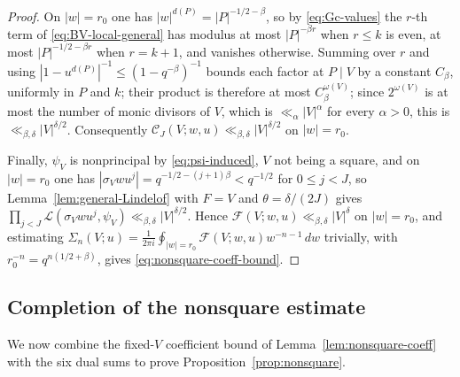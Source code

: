 \documentclass[a4paper,reqno]{amsart}
\numberwithin{equation}{section}
\theoremstyle{remark}
\theoremstyle{definition}
\begin{document}
\begin{proof}
On $|w|=r_0$ one has $|w|^{d(P)}=|P|^{-1/2-\beta}$, so by
\eqref{eq:Gc-values} the $r$-th term of \eqref{eq:BV-local-general} has
modulus at most $|P|^{-\beta r}$ when $r\le k$ is even, at most
$|P|^{-1/2-\beta r}$ when $r=k+1$, and vanishes otherwise. Summing over $r$
and using $|1-u^{d(P)}|^{-1}\le(1-q^{-\beta})^{-1}$ bounds each factor at
$P\mid V$ by a constant $C_\beta$, uniformly in $P$ and $k$; their product
is therefore at most $C_\beta^{\omega(V)}$; since $2^{\omega(V)}$ is at most
the number of monic divisors of $V$, which is $\ll_\alpha|V|^\alpha$ for
every $\alpha>0$, this is $\ll_{\beta,\delta}|V|^{\delta/2}$. Consequently
$\mathcal C_J(V;w,u)\ll_{\beta,\delta}|V|^{\delta/2}$ on $|w|=r_0$.

Finally, $\psi_V$ is nonprincipal by \eqref{eq:psi-induced}, $V$ not being
a square, and on $|w|=r_0$ one has
$|\sigma_Vwu^j|=q^{-1/2-(j+1)\beta}<q^{-1/2}$ for $0\le j<J$, so
Lemma~\ref{lem:general-Lindelof} with $F=V$ and $\theta=\delta/(2J)$ gives
$\prod_{j<J}\mathcal L(\sigma_Vwu^j,\psi_V)\ll_{\beta,\delta}|V|^{\delta/2}$.
Hence $\mathcal F(V;w,u)\ll_{\beta,\delta}|V|^\delta$ on $|w|=r_0$, and
estimating
$\Sigma_n(V;u)=\frac{1}{2\pi i}\oint_{|w|=r_0}\mathcal F(V;w,u)w^{-n-1}\,dw$
trivially, with $r_0^{-n}=q^{n(1/2+\beta)}$, gives
\eqref{eq:nonsquare-coeff-bound}.
\end{proof}

\subsection{Completion of the nonsquare estimate}

We now combine the fixed-$V$ coefficient bound of
Lemma~\ref{lem:nonsquare-coeff} with the six dual sums to prove
Proposition~\ref{prop:nonsquare}.
\end{document}
